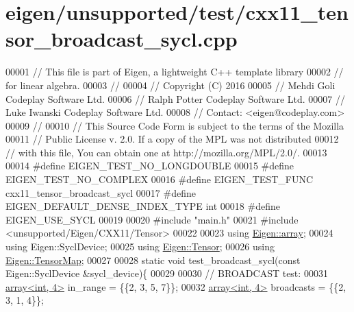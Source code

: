 \hypertarget{eigen_2unsupported_2test_2cxx11__tensor__broadcast__sycl_8cpp_source}{}\section{eigen/unsupported/test/cxx11\+\_\+tensor\+\_\+broadcast\+\_\+sycl.cpp}
\label{eigen_2unsupported_2test_2cxx11__tensor__broadcast__sycl_8cpp_source}

\begin{DoxyCode}
00001 \textcolor{comment}{// This file is part of Eigen, a lightweight C++ template library}
00002 \textcolor{comment}{// for linear algebra.}
00003 \textcolor{comment}{//}
00004 \textcolor{comment}{// Copyright (C) 2016}
00005 \textcolor{comment}{// Mehdi Goli    Codeplay Software Ltd.}
00006 \textcolor{comment}{// Ralph Potter  Codeplay Software Ltd.}
00007 \textcolor{comment}{// Luke Iwanski  Codeplay Software Ltd.}
00008 \textcolor{comment}{// Contact: <eigen@codeplay.com>}
00009 \textcolor{comment}{//}
00010 \textcolor{comment}{// This Source Code Form is subject to the terms of the Mozilla}
00011 \textcolor{comment}{// Public License v. 2.0. If a copy of the MPL was not distributed}
00012 \textcolor{comment}{// with this file, You can obtain one at http://mozilla.org/MPL/2.0/.}
00013 
00014 \textcolor{preprocessor}{#define EIGEN\_TEST\_NO\_LONGDOUBLE}
00015 \textcolor{preprocessor}{#define EIGEN\_TEST\_NO\_COMPLEX}
00016 \textcolor{preprocessor}{#define EIGEN\_TEST\_FUNC cxx11\_tensor\_broadcast\_sycl}
00017 \textcolor{preprocessor}{#define EIGEN\_DEFAULT\_DENSE\_INDEX\_TYPE int}
00018 \textcolor{preprocessor}{#define EIGEN\_USE\_SYCL}
00019 
00020 \textcolor{preprocessor}{#include "main.h"}
00021 \textcolor{preprocessor}{#include <unsupported/Eigen/CXX11/Tensor>}
00022 
00023 \textcolor{keyword}{using} \hyperlink{class_eigen_1_1array}{Eigen::array};
00024 \textcolor{keyword}{using} Eigen::SyclDevice;
00025 \textcolor{keyword}{using} \hyperlink{class_eigen_1_1_tensor}{Eigen::Tensor};
00026 \textcolor{keyword}{using} \hyperlink{class_eigen_1_1_tensor_map}{Eigen::TensorMap};
00027 
00028 \textcolor{keyword}{static} \textcolor{keywordtype}{void} test\_broadcast\_sycl(\textcolor{keyword}{const} Eigen::SyclDevice &sycl\_device)\{
00029 
00030   \textcolor{comment}{// BROADCAST test:}
00031   \hyperlink{class_eigen_1_1array}{array<int, 4>} in\_range   = \{\{2, 3, 5, 7\}\};
00032   \hyperlink{class_eigen_1_1array}{array<int, 4>} broadcasts = \{\{2, 3, 1, 4\}\};

\end{DoxyCode}
